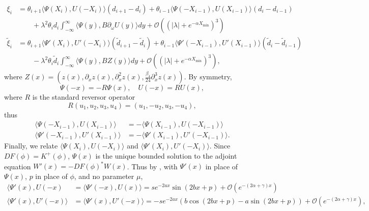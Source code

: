 \documentclass[12pt]{elsarticle}
\begin{document}
\begin{equation}\label{jumpcond1}
\begin{aligned}
\xi_i &= \theta_{i+1} \langle \Psi(X_i), U(-X_i) \rangle (d_{i+1} - d_i) 
+ \theta_{i-1} \langle \Psi(-X_{i-1}), U(X_{i-1}) \rangle (d_i - d_{i-1} )  \\
&\qquad + \lambda^2 \theta_i d_i \int_{-\infty}^\infty \langle \Psi(y), B \partial_\omega U(y) \rangle dy 
+ \mathcal{O}((|\lambda| + e^{-\alpha X_{\min}})^3) \\
\tilde{\xi}_i &= \theta_{i+1} \langle \Psi'(X_i), U'(-X_i) \rangle (\tilde{d}_{i+1} - \tilde{d}_i) 
+ \theta_{i-1} \langle \Psi'(-X_{i-1}), U'(X_{i-1}) \rangle (\tilde{d}_i - \tilde{d}_{i-1}) \\
&\qquad- \lambda^2 \theta_i \tilde{d}_i \int_{-\infty}^\infty \langle \Psi(y), B Z(y) \rangle dy 
+ \mathcal{O}((|\lambda| + e^{-\alpha X_{\min}})^3),
\end{aligned}
\end{equation}
where $Z(x) = (z(x), \partial_x z(x), \partial_x^2 z(x), \frac{\beta_4}{24} \partial_x^3 z(x))$. By symmetry, 
\begin{equation}\label{Rrelation}
\Psi(-x) = -R \Psi(x), \quad U(-x) = R U(x),
\end{equation}
where $R$ is the standard reversor operator 
\[
R(u_1, u_2, u_3, u_4) = (u_1, -u_2, u_3, -u_4),
\] 
thus 
\begin{equation}\label{PsiR}
\begin{aligned}
\langle \Psi(-X_{i-1}), U(X_{i-1}) \rangle &= -\langle \Psi(X_{i-1}), U(-X_{i-1}) \rangle \\
\langle \Psi'(-X_{i-1}), U'(X_{i-1}) \rangle &= -\langle \Psi'(X_{i-1}), U'(-X_{i-1}) \rangle.
\end{aligned} 
\end{equation}
Finally, we relate $\langle \Psi(X_i), U(-X_i) \rangle$ and $\langle \Psi'(X_i), U'(-X_i) \rangle$. Since $DF(\phi) = K^+(\phi)$, $\Psi(x)$ is the unique bounded solution to the adjoint equation $W'(x) = -DF(\phi)^* W(x)$. Thus by \cite[Lemma 6.1]{Sandstede1998}, with $\Psi'(x)$ in place of $\Psi(x)$, $p$ in place of $\phi$, and no parameter $\mu$,
\begin{align}
\langle \Psi'(x), U(-x) &= \langle \Psi'(-x), U(x) \rangle = s e^{-2 a x} \sin(2 b x + p) + \mathcal{O}(e^{-(2 \alpha + \gamma)x}) \label{IPdPsiU} \\
\langle \Psi'(x), U'(-x) \rangle &= 
\langle \Psi'(x), U'(-x) \rangle = -s e^{-2 a x} \left( b \cos(2 b x + p) - a \sin(2 b x + p) \right) + \mathcal{O}(e^{-(2 \alpha + \gamma)x}), \label{IPdPsidU}
\end{align}
\end{document}
